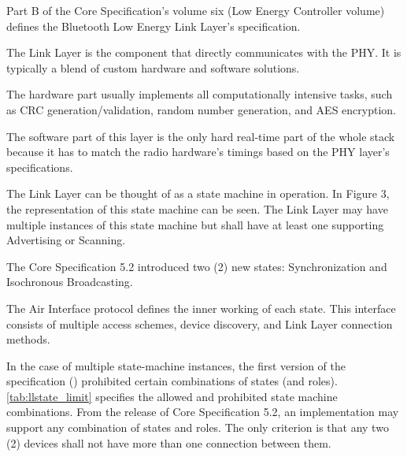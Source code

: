 Part B of the Core Specification's volume six (Low Energy Controller volume)
defines the Bluetooth Low Energy Link Layer's specification.

The Link Layer is the component that directly communicates with the PHY.
It is typically a blend of custom hardware and software solutions. \cite{Townsend14}

The hardware part usually implements all computationally intensive tasks,
such as CRC generation/validation, random number generation, and AES encryption.

The software part of this layer is the only hard real-time part of
the whole stack because it has to match the radio hardware's timings
based on the PHY layer's specifications.

The Link Layer can be thought of as a state machine in operation.
In Figure 3, the representation of this state machine can be seen.
The Link Layer may have multiple instances of this state machine but shall have at least one supporting Advertising or Scanning.\cite{bt40}

The Core Specification 5.2 introduced two (2) new states:
Synchronization and Isochronous Broadcasting.

The Air Interface protocol defines the inner working of each state.
This interface consists of multiple access schemes, device discovery,
and Link Layer connection methods.

In the case of multiple state-machine instances, the first version of the
specification (\cite{bt40}) prohibited certain combinations of states (and roles).
\autoref{tab:llstate_limit} specifies the allowed and prohibited state machine combinations.
From the release of Core Specification 5.2, an implementation may support
any combination of states and roles. The only criterion is that any two (2)
devices shall not have more than one connection between them. \cite{bt52}

